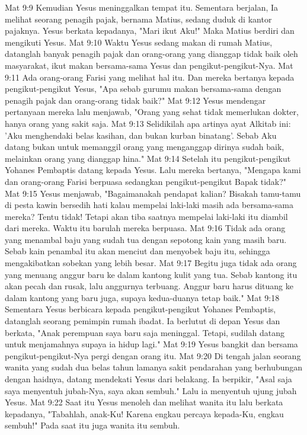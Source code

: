 Mat 9:9  Kemudian Yesus meninggalkan tempat itu. Sementara berjalan, Ia melihat seorang penagih pajak, bernama Matius, sedang duduk di kantor pajaknya. Yesus berkata kepadanya, "Mari ikut Aku!" Maka Matius berdiri dan mengikuti Yesus.
Mat 9:10  Waktu Yesus sedang makan di rumah Matius, datanglah banyak penagih pajak dan orang-orang yang dianggap tidak baik oleh masyarakat, ikut makan bersama-sama Yesus dan pengikut-pengikut-Nya.
Mat 9:11  Ada orang-orang Farisi yang melihat hal itu. Dan mereka bertanya kepada pengikut-pengikut Yesus, "Apa sebab gurumu makan bersama-sama dengan penagih pajak dan orang-orang tidak baik?"
Mat 9:12  Yesus mendengar pertanyaan mereka lalu menjawab, "Orang yang sehat tidak memerlukan dokter, hanya orang yang sakit saja.
Mat 9:13  Selidikilah apa artinya ayat Alkitab ini: 'Aku menghendaki belas kasihan, dan bukan kurban binatang'. Sebab Aku datang bukan untuk memanggil orang yang menganggap dirinya sudah baik, melainkan orang yang dianggap hina."
Mat 9:14  Setelah itu pengikut-pengikut Yohanes Pembaptis datang kepada Yesus. Lalu mereka bertanya, "Mengapa kami dan orang-orang Farisi berpuasa sedangkan pengikut-pengikut Bapak tidak?"
Mat 9:15  Yesus menjawab, "Bagaimanakah pendapat kalian? Bisakah tamu-tamu di pesta kawin bersedih hati kalau mempelai laki-laki masih ada bersama-sama mereka? Tentu tidak! Tetapi akan tiba saatnya mempelai laki-laki itu diambil dari mereka. Waktu itu barulah mereka berpuasa.
Mat 9:16  Tidak ada orang yang menambal baju yang sudah tua dengan sepotong kain yang masih baru. Sebab kain penambal itu akan menciut dan menyobek baju itu, sehingga mengakibatkan sobekan yang lebih besar.
Mat 9:17  Begitu juga tidak ada orang yang menuang anggur baru ke dalam kantong kulit yang tua. Sebab kantong itu akan pecah dan rusak, lalu anggurnya terbuang. Anggur baru harus dituang ke dalam kantong yang baru juga, supaya kedua-duanya tetap baik."
Mat 9:18  Sementara Yesus berbicara kepada pengikut-pengikut Yohanes Pembaptis, datanglah seorang pemimpin rumah ibadat. Ia berlutut di depan Yesus dan berkata, "Anak perempuan saya baru saja meninggal. Tetapi, sudilah datang untuk menjamahnya supaya ia hidup lagi."
Mat 9:19  Yesus bangkit dan bersama pengikut-pengikut-Nya pergi dengan orang itu.
Mat 9:20  Di tengah jalan seorang wanita yang sudah dua belas tahun lamanya sakit pendarahan yang berhubungan dengan haidnya, datang mendekati Yesus dari belakang. Ia berpikir, "Asal saja saya menyentuh jubah-Nya, saya akan sembuh." Lalu ia menyentuh ujung jubah Yesus.
Mat 9:22  Saat itu Yesus menoleh dan melihat wanita itu lalu berkata kepadanya, "Tabahlah, anak-Ku! Karena engkau percaya kepada-Ku, engkau sembuh!" Pada saat itu juga wanita itu sembuh.
